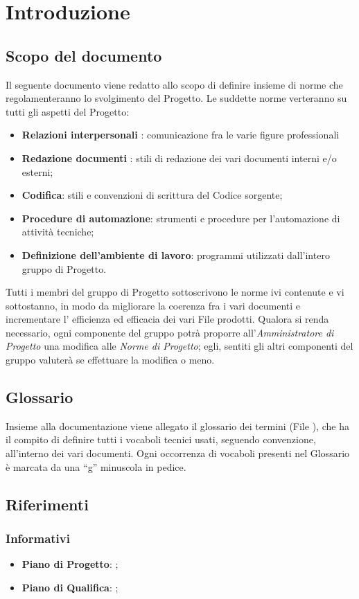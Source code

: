 \section{Introduzione}{
	\subsection{Scopo del documento}{
		Il seguente documento viene redatto allo scopo di definire insieme di norme che regolamenteranno lo svolgimento del Progetto. Le suddette norme verteranno su tutti gli aspetti del Progetto:
		\begin{itemize}
        \item \textbf{Relazioni interpersonali} : comunicazione fra le varie figure professionali \item \textbf{Redazione documenti} : stili di redazione dei vari documenti interni e/o	esterni;
		\item \textbf{Codifica}: stili e convenzioni di scrittura del Codice sorgente;
		\item \textbf{Procedure di automazione}: strumenti e procedure per l’automazione di attività tecniche;
		\item \textbf{Definizione dell’ambiente di lavoro}: programmi utilizzati dall’intero gruppo di Progetto.
		\end{itemize}
		Tutti i membri del gruppo di Progetto sottoscrivono le norme ivi contenute e vi	sottostanno, in modo da migliorare la coerenza fra i vari documenti e incrementare l' efficienza ed efficacia dei vari File prodotti.	Qualora si renda necessario, ogni componente del gruppo potrà proporre all’\emph{Amministratore di Progetto} una modifica alle \emph{Norme di Progetto}; egli, sentiti gli altri componenti del gruppo valuterà se effettuare la modifica o meno.
		
	 }
	\subsection{Glossario}{ 
	Insieme alla documentazione viene allegato il glossario dei termini (File \href{run:../../Esterni/\fGlossario}{\fEscapeGlossario}), che ha il compito di definire tutti i vocaboli tecnici usati, seguendo convenzione, all’interno dei vari documenti.  Ogni occorrenza di vocaboli presenti nel Glossario è marcata da una “g” minuscola in pedice.	
	}
}
   \subsection{Riferimenti}
     \subsubsection{Informativi}
     \begin{itemize}
       \item \textbf{Piano di Progetto}: \href{run:../../Interni/\fPianoDiProgetto}{\fEscapePianoDiProgetto};
       \item \textbf{Piano di Qualifica}:  \href{run:../../Esterni/\fPianoDiQualifica}{\fEscapePianoDiQualifica};
     \end{itemize}
        